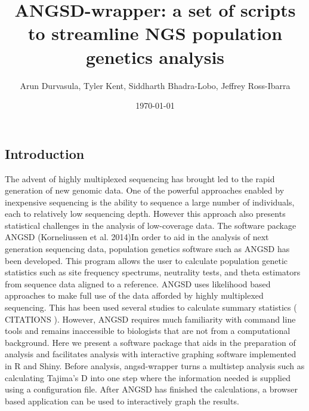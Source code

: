\documentclass[final]{beamer}
\title
[BAPG, 6 December 2014, Davis, CA, USA] %
{ %
ANGSD-wrapper: a set of scripts to streamline NGS population genetics analysis
}
\author{ %
Arun Durvasula\inst{1}, Tyler Kent\inst{1}, Siddharth Bhadra-Lobo\inst{1}, Jeffrey Ross-Ibarra\inst{2}
}
\institute
[University of California, Davis] %
{
\inst{1} Dept. of Plant Sciences, University of California Davis\\[0.3ex]
\inst{2} Dept. of Plant Sciences, Center for Population Biology, and Genome Center, University of California Davis\\[0.3ex]
}
\date{\today}
\begin{document}
\begin{frame}[t]
\begin{multicols}{3}

\section{Introduction}

	The advent of highly multiplexed sequencing has brought led to the rapid generation of new genomic data. One of the powerful approaches enabled by inexpensive sequencing is the ability to sequence a large number of individuals, each to relatively low sequencing depth. However this approach also presents statistical challenges in the analysis of low-coverage data.  The software package ANGSD (Korneliussen et al. 2014)In order to aid in the analysis of next generation sequencing data, population genetics software such as ANGSD has been developed. This program allows the user to calculate population genetic statistics such as site frequency spectrums, neutrality tests, and 
theta estimators from sequence data aligned to a reference. ANGSD uses likelihood based approaches to make full use of the data afforded by highly multiplexed sequencing. This has been used several studies to calculate summary statistics ( CITATIONS ). However, ANGSD requires much familiarity with command line tools and remains inaccessible to biologists that are not from a computational background. 
	Here we present a software package that aids in the preparation of analysis and facilitates analysis with interactive graphing software implemented in R and Shiny. Before analysis, angsd-wrapper turns a multistep analysis such as calculating Tajima’s D into one step where the information needed is supplied using a configuration file. After ANGSD has finished the calculations, a browser based application can be used to interactively graph the results. 



\end{multicols}
\end{frame}
\end{document}
